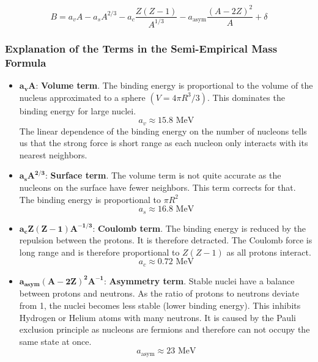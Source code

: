 \documentclass{article}
\begin{document}
\begin{equation}\label{eq: semi_empirical_mass_formula}
B = a_vA - a_sA^{2 / 3} - a_c\frac{Z(Z-1)}{A^{1 / 3}} - a_{\text{asym}}\frac{(A-2Z)^2}{A} + δ
\end{equation}
\subsubsection{Explanation of the Terms in the Semi-Empirical Mass Formula}\label{sssec: Explenation of the Terms in the Semi-Empirical Mass Formula}
\begin{itemize}
    \item $\mathbf{a_vA}$: \textbf{Volume term}. The binding energy is proportional to the volume of the nucleus approximated to a sphere $\left(V = 4πR^3/3\right)$. This dominates the binding energy for large nuclei. 
    \begin{equation}
    a_v ≈ 15.8 \text{ MeV}
    \end{equation}
    The linear dependence of the binding energy on the number of nucleons tells us that the strong force is short range as each nucleon only interacts with its nearest neighbors. 
    \item $\mathbf{a_sA^{2 / 3}}$: \textbf{Surface term}. The volume term is not quite accurate as the nucleons on the surface have fewer neighbors. This term corrects for that. The binding energy is proportional to $πR^2$
    \begin{equation}
    a_s ≈ 16.8 \text{ MeV}
    \end{equation} 
    \item $\mathbf{a_cZ(Z-1)A^{-1 / 3}}$: \textbf{Coulomb term}. The binding energy is reduced by the repulsion between the protons. It is therefore detracted. The Coulomb force is long range and is therefore proportional to $Z(Z-1)$ as all protons interact. 
    \begin{equation}
    a_c ≈ 0.72 \text{ MeV}
    \end{equation}
    \item $\mathbf{a_{\text{asym}}(A-2Z)^2A^{-1}}$: \textbf{Asymmetry term}. Stable nuclei have a balance between protons and neutrons. As the ratio of protons to neutrons deviate from 1, the nuclei becomes less stable (lower binding energy). This inhibits Hydrogen or Helium atoms with many neutrons. It is caused by the Pauli exclusion principle as nucleons are fermions and therefore can not occupy the same state at once. 
    \begin{equation}
    a_{\text{asym}} ≈ 23 \text{ MeV}

\end{equation}
\end{itemize}
\end{document}
